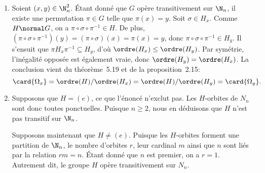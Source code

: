 \begin{enumerate}
  \item 

    Soient $(x,y)\in\N_n^2$.
    Étant donné que $G$ opère transitivement sur $\N_n$, il existe une permutation $\pi\in G$ telle que $\pi(x) = y$.
    Soit $\sigma\in H_x$.
    Comme $H\normal G$, on a $\pi\circ\sigma\circ\pi^{-1}\in H$.
    De plus, $(\pi\circ\sigma\circ\pi^{-1})(y) = (\pi\circ\sigma)(x) = \pi(x) = y$, donc $\pi\circ\sigma\circ\pi^{-1}\in H_y$.
    Il s'ensuit que $\pi H_x \pi^{-1} \subseteq H_y$, d'où $\ordre(H_x) \leq \ordre(H_y)$.
    Par symétrie, l'inégalité opposée est également vraie, donc $\ordre(H_y) = \ordre(H_x)$.
    La conclusion vient du théorème~5.19 et de la proposition~2.15:
    \[
      \card{\Omega_x} 
        = \ordre(H)/\ordre(H_x) 
        = \ordre(H)/\ordre(H_y)
        = \card{\Omega_y}.
    \]

  \item

    Supposons que $H = (e)$, ce que l'énoncé n'exclut pas.
    Les $H$-orbites de $N_n$ sont donc toutes ponctuelles.
    Puisque $n\geq 2$, nous en déduisons que $H$ n'est pas transitif sur $\N_n$.

    Supposons maintenant que $H \neq (e)$.
    Puisque les $H$-orbites forment une partition de $\N_n$, le nombre d'orbites $r$, leur cardinal $m$ ainsi que $n$ sont liés par la relation $rm = n$.
    Étant donné que $n$ est premier, on a $r = 1$.
    Autrement dit, le groupe $H$ opère transitivement sur $N_n$.
\end{enumerate}
